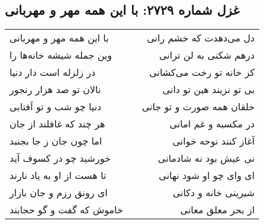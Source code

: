 \begin{center}
\section*{غزل شماره ۲۷۲۹: با این همه مهر و مهربانی}
\label{sec:2729}
\begin{longtable}{l p{0.5cm} r}
با این همه مهر و مهربانی
&&
دل می‌دهدت که خشم رانی
\\
وین جمله شیشه خانه‌ها را
&&
درهم شکنی به لن ترانی
\\
در زلزله است دار دنیا
&&
کز خانه تو رخت می‌کشانی
\\
نالان تو صد هزار رنجور
&&
بی تو نزیند هین تو دانی
\\
دنیا چو شب و تو آفتابی
&&
خلقان همه صورت و تو جانی
\\
هر چند که غافلند از جان
&&
در مکسبه و غم امانی
\\
اما چون جان ز جا بجنبد
&&
آغاز کنند نوحه خوانی
\\
خورشید چو در کسوف آید
&&
نی عیش بود نه شادمانی
\\
تا هست از او به یاد نارند
&&
ای وای چو او شود نهانی
\\
ای رونق رزم و جان بازار
&&
شیرینی خانه و دکانی
\\
خاموش که گفت و گو حجابند
&&
از بحر معلق معانی
\\
\end{longtable}
\end{center}

